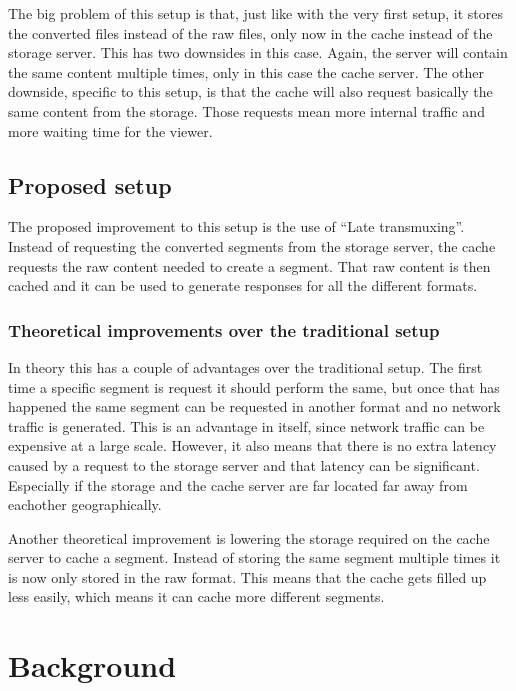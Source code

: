 \documentclass[twoside,openright]{uva-bachelor-thesis}
\begin{document}
The big problem of this setup is that, just like with the very first setup, it
stores the converted files instead of the raw files, only now in the cache
instead of the storage server. This has two downsides in this case. Again, the
server will contain the same content multiple times, only in this case the cache
server. The other downside, specific to this setup, is that the cache will also
request basically the same content from the storage. Those requests mean more
internal traffic and more waiting time for the viewer.

\section{Proposed setup}
The proposed improvement to this setup is the use of ``Late transmuxing''.
Instead of requesting the converted segments from the storage server, the cache
requests the raw content needed to create a segment. That raw content is then
cached and it can be used to generate responses for all the different formats.

\subsection{Theoretical improvements over the traditional setup}
In theory this has a couple of advantages over the traditional setup. The first
time a specific segment is request it should perform the same, but once that has
happened the same segment can be requested in another format and no network
traffic is generated. This is an advantage in itself, since network traffic can
be expensive at a large scale. However, it also means that there is no extra
latency caused by a request to the storage server and that latency can be
significant. Especially if the storage and the cache server are far located far
away from eachother geographically.

Another theoretical improvement is lowering the storage required on the cache
server to cache a segment. Instead of storing the same segment multiple times it
is now only stored in the raw format. This means that the cache gets filled up
less easily, which means it can cache more different segments.







\chapter{Background}
\end{document}
